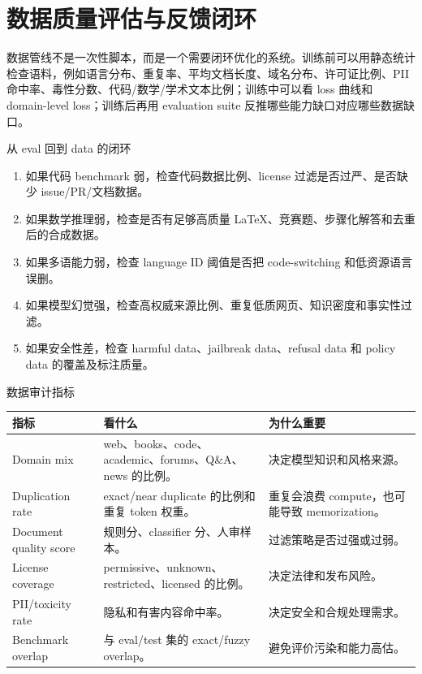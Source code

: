 \documentclass[a4paper]{article}
\begin{document}
\section{数据质量评估与反馈闭环}

数据管线不是一次性脚本，而是一个需要闭环优化的系统。训练前可以用静态统计检查语料，例如语言分布、重复率、平均文档长度、域名分布、许可证比例、PII 命中率、毒性分数、代码/数学/学术文本比例；训练中可以看 loss 曲线和 domain-level loss；训练后再用 evaluation suite 反推哪些能力缺口对应哪些数据缺口。

\begin{importantbox}{从 eval 回到 data 的闭环}
\begin{enumerate}
    \item 如果代码 benchmark 弱，检查代码数据比例、license 过滤是否过严、是否缺少 issue/PR/文档数据。
    \item 如果数学推理弱，检查是否有足够高质量 LaTeX、竞赛题、步骤化解答和去重后的合成数据。
    \item 如果多语能力弱，检查 language ID 阈值是否把 code-switching 和低资源语言误删。
    \item 如果模型幻觉强，检查高权威来源比例、重复低质网页、知识密度和事实性过滤。
    \item 如果安全性差，检查 harmful data、jailbreak data、refusal data 和 policy data 的覆盖及标注质量。
\end{enumerate}
\end{importantbox}

\begin{knowledgebox}{数据审计指标}
\begin{longtable}{L{0.22\textwidth}L{0.34\textwidth}L{0.34\textwidth}}
\toprule
指标 & 看什么 & 为什么重要 \\
\midrule
\endhead
Domain mix & web、books、code、academic、forums、Q\&A、news 的比例。 & 决定模型知识和风格来源。 \\
Duplication rate & exact/near duplicate 的比例和重复 token 权重。 & 重复会浪费 compute，也可能导致 memorization。 \\
Document quality score & 规则分、classifier 分、人审样本。 & 过滤策略是否过强或过弱。 \\
License coverage & permissive、unknown、restricted、licensed 的比例。 & 决定法律和发布风险。 \\
PII/toxicity rate & 隐私和有害内容命中率。 & 决定安全和合规处理需求。 \\
Benchmark overlap & 与 eval/test 集的 exact/fuzzy overlap。 & 避免评价污染和能力高估。 \\
\bottomrule
\end{longtable}
\end{knowledgebox}
\end{document}
